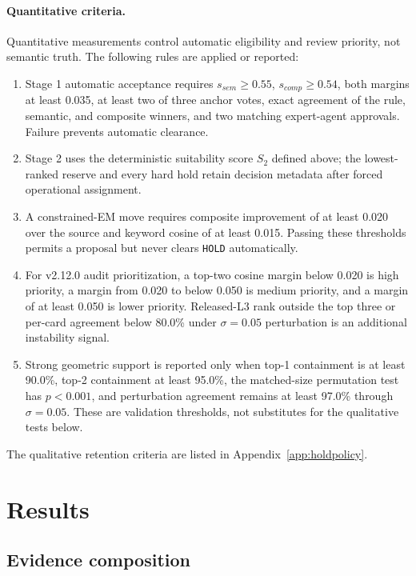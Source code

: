 \documentclass[11pt,a4paper]{article}
\newcommand{\code}[1]{\texttt{#1}}
\begin{document}
\paragraph{Quantitative criteria.}
Quantitative measurements control automatic eligibility and review priority,
not semantic truth. The following rules are applied or reported:
\begin{enumerate}[leftmargin=2em]
  \item Stage 1 automatic acceptance requires $s_{sem}\geq0.55$,
  $s_{comp}\geq0.54$, both margins at least 0.035, at least two of three anchor
  votes, exact agreement of the rule, semantic, and composite winners, and two
  matching expert-agent approvals. Failure prevents automatic clearance.
  \item Stage 2 uses the deterministic suitability score $S_2$ defined above;
  the lowest-ranked reserve and every hard hold retain decision metadata after
  forced operational assignment.
  \item A constrained-EM move requires composite improvement of at least 0.020
  over the source and keyword cosine of at least 0.015. Passing these thresholds
  permits a proposal but never clears \code{HOLD} automatically.
  \item For v2.12.0 audit prioritization, a top-two cosine margin below 0.020 is
  high priority, a margin from 0.020 to below 0.050 is medium priority, and a
  margin of at least 0.050 is lower priority. Released-L3 rank outside the top
  three or per-card agreement below 80.0\% under $\sigma=0.05$ perturbation is
  an additional instability signal.
  \item Strong geometric support is reported only when top-1 containment is at
  least 90.0\%, top-2 containment at least 95.0\%, the matched-size permutation
  test has $p<0.001$, and perturbation agreement remains at least 97.0\% through
  $\sigma=0.05$. These are validation thresholds, not substitutes for the
  qualitative tests below.
\end{enumerate}

The qualitative retention criteria are listed in Appendix~\ref{app:holdpolicy}.

\section{Results}
\label{sec:results}

\subsection{Evidence composition}
\end{document}
